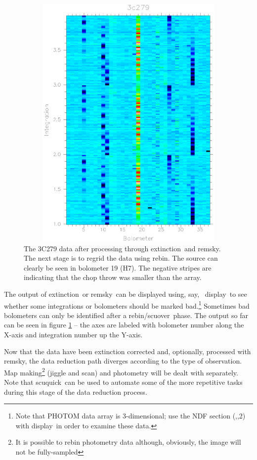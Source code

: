 \documentclass[twoside,11pt]{article}
\newcommand{\Kappa}{\xref{{\sc{Kappa}}}{sun95}{}}
\newcommand{\task}[1]{{\sf #1}}
\newcommand{\rebin}{\htmlref{\task{rebin}}{REBIN}}
\newcommand{\ext}{\htmlref{\task{extinction}}{EXTINCTION}}
\newcommand{\scuquick}{\htmlref{\task{scuquick}}{SCUQUICK}}
\newcommand{\remsky}{\htmlref{\task{remsky}}{REMSKY}}
\newcommand{\scuover}{\htmlref{\task{scuover}}{SCUOVER}}
\newcommand{\display}{\xref{\task{display}}{sun95}{DISPLAY}}
\newcommand{\htmlref}[2]{#1}
\newcommand{\htmlimage}[1]{}
\newcommand{\xref}[3]{#1}
\renewcommand{\_}{\texttt{\symbol{95}}}
\begin{document}
\begin{figure}
\begin{center}
\includegraphics[width=5in,height=5in]{sun216_remsky.eps}
\caption{The 3C279 data after processing through \ext\ and \remsky. The next
stage is to regrid the data using \rebin. The source can clearly be seen 
in bolometer 19 (H7). The negative stripes are indicating that the chop
throw was smaller than the array.}
\label{remsky}
\end{center}
\end{figure}


The output of \ext\ or \remsky\ can be displayed using, say, \Kappa\
\display\ to see whether some integrations or bolometers should be marked
bad.\footnote{Note that PHOTOM data array is 3-dimensional; use the NDF
section (,,2) with \display\ in order to examine these data.} Sometimes bad
bolometers can only be identified after a \rebin/\scuover\ phase. The output
so far can be seen in figure \ref{remsky} -- the axes are labeled with
bolometer number along the X-axis and integration number up the Y-axis.

Now that the data have been extinction corrected and, optionally, processed
with \remsky, the data reduction path diverges according to the type of
observation. Map making\footnote{It is possible to rebin photometry data
although, obviously, the image will not be fully-sampled} (jiggle and scan) 
and photometry will be dealt with separately. Note that \scuquick\ can be used to automate some of
the more repetitive tasks during this stage of the data reduction process.
\end{document}
